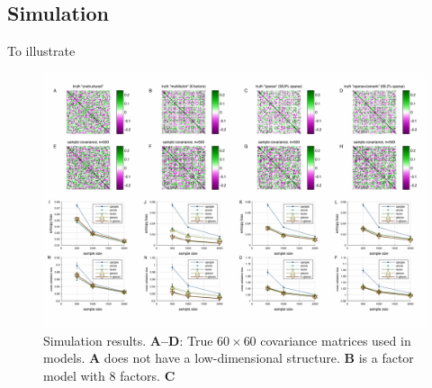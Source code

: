 \subsection{Simulation}
To illustrate 

\begin{figure}
\centering
\includegraphics[width=1.0\textwidth]{figures/Figure3.pdf}
\caption{
Simulation results.
\textbf{A--D}: True $60\times60$ covariance matrices used in models. \textbf{A} does not have a low-dimensional structure.  \textbf{B} is a factor model with 8 factors. \textbf{C}
}\label{fig:03}
\end{figure}


